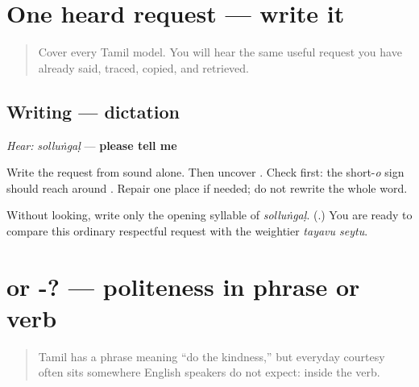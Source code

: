 \section[\texorpdfstring{\ta{சொல்லுங்கள்} (solluṅgaḷ)}{சொல்லுங்கள் (solluṅgaḷ)}]{One heard request — write it}

\label{lesson:TA-W08-sollungal-dictation}



\begin{quote}
Cover every Tamil model. You will hear the same useful request you have already said, traced, copied, and retrieved.
\end{quote}

\subsection*{Writing — dictation}
\emph{Hear:} \emph{solluṅgaḷ} — \textbf{please tell me}

Write the request from sound alone. Then uncover \textbf{}. Check \textbf{} first: the short-\emph{o} sign should reach around \textbf{}. Repair one place if needed; do not rewrite the whole word.

\begin{tcolorbox}[breakable,colback=teal!4,colframe=teal!35!black,title={Before you move on}]
Without looking, write only the opening syllable of \emph{solluṅgaḷ}. (\textbf{}.) You are ready to compare this ordinary respectful request with the weightier \emph{tayavu seytu}.
\end{tcolorbox}
\section[\texorpdfstring{\ta{தயவுசெய்து} / -\ta{உங்கள்} (tayavu seytu / uṅgaḷ)}{தயவுசெய்து / -உங்கள் (tayavu seytu / uṅgaḷ)}]{ or -? — politeness in phrase or verb}

\label{lesson:TA-C08-please-register}



\begin{quote}
Tamil has a phrase meaning \textquotedblleft{}do the kindness,\textquotedblright{} but everyday courtesy often sits somewhere English speakers do not expect: inside the verb.
\end{quote}

